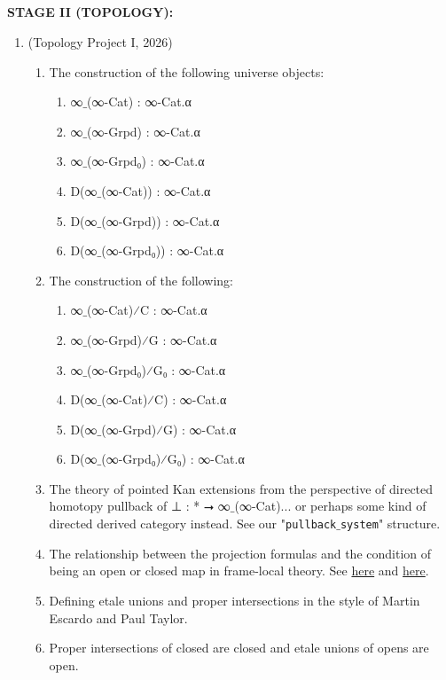 \documentclass{book}
\newcounter{pcounter}
\newcounter{sectioncount}
\newcounter{subsectioncount}
\renewcommand{\section}[1]{\newpage\ \\ \ \\ \begin{center} \scalebox{1.5}{\texttt{\thesectioncount . #1}} \stepcounter{sectioncount} \setcounter{subsectioncount}{1} \end{center} \begin{center} \ \\ \ \\ \thispagestyle{empty} \end{center}}
\begin{document}
\section{\scalebox{0.6}{Stage II: Goals concerning geometric maps in topos theory and stable homotopy}}

{\bf STAGE II (TOPOLOGY):}
\begin{enumerate}
\item (Topology Project I, 2026)
\begin{enumerate}
\item The construction of the following universe objects:
\begin{enumerate}
\item ∞${}\_$(∞-Cat) : ∞-Cat.α
\item ∞${}\_$(∞-Grpd) : ∞-Cat.α
\item ∞${}\_$(∞-Grpd₀) : ∞-Cat.α
\item D(∞${}\_$(∞-Cat)) : ∞-Cat.α
\item D(∞${}\_$(∞-Grpd)) : ∞-Cat.α
\item D(∞${}\_$(∞-Grpd₀)) : ∞-Cat.α
\end{enumerate}
\item The construction of the following:
\begin{enumerate}
\item ∞${}\_$(∞-Cat)⁄C : ∞-Cat.α
\item ∞${}\_$(∞-Grpd)⁄G : ∞-Cat.α
\item ∞${}\_$(∞-Grpd₀)⁄G₀ : ∞-Cat.α
\item D(∞${}\_$(∞-Cat)⁄C) : ∞-Cat.α
\item D(∞${}\_$(∞-Grpd)⁄G) : ∞-Cat.α
\item D(∞${}\_$(∞-Grpd₀)⁄G₀) : ∞-Cat.α
\end{enumerate}
\item The theory of pointed Kan extensions from the perspective of directed homotopy pullback of ⊥ : * ⭢ ∞${}\_$(∞-Cat)... or perhaps some kind of directed derived category instead. See our "\texttt{pullback}$\_$\texttt{system}" structure.
\item The relationship between the projection formulas and the condition of being an open or closed map in frame-local theory. See \href{https://ncatlab.org/nlab/show/closed+morphism}{here} and \href{https://ncatlab.org/nlab/show/open+morphism}{here}.
\item Defining etale unions and proper intersections in the style of Martin Escardo and Paul Taylor.
\item Proper intersections of closed are closed and etale unions of opens are open.

\end{enumerate}
\end{enumerate}
\end{document}
